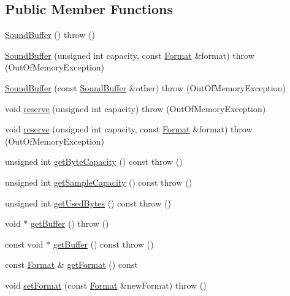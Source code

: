 \subsection*{Public Member Functions}
\begin{DoxyCompactItemize}
\item 
\hyperlink{classAudio_1_1SoundBuffer_a7ee5dea6d25edde63367906605c343a3}{Sound\+Buffer} ()  throw ()
\item 
\hyperlink{classAudio_1_1SoundBuffer_a8147b306d37589176c8dd5a971ea4ab8}{Sound\+Buffer} (unsigned int capacity, const \hyperlink{structAudio_1_1Format}{Format} \&format)  throw (\+Out\+Of\+Memory\+Exception)
\item 
\hyperlink{classAudio_1_1SoundBuffer_ab74bc6e8116beb9629646a24cfd8bd93}{Sound\+Buffer} (const \hyperlink{classAudio_1_1SoundBuffer}{Sound\+Buffer} \&other)  throw (\+Out\+Of\+Memory\+Exception)
\item 
void \hyperlink{classAudio_1_1SoundBuffer_a330ca69d99d6e39d83a419bc7d580b57}{reserve} (unsigned int capacity)  throw (\+Out\+Of\+Memory\+Exception)
\item 
void \hyperlink{classAudio_1_1SoundBuffer_a593491238df1c985a96c805eff2fa752}{reserve} (unsigned int capacity, const \hyperlink{structAudio_1_1Format}{Format} \&format)  throw (\+Out\+Of\+Memory\+Exception)
\item 
unsigned int \hyperlink{classAudio_1_1SoundBuffer_af4d32175623442e285d28a3649c950c8}{get\+Byte\+Capacity} () const   throw ()
\item 
unsigned int \hyperlink{classAudio_1_1SoundBuffer_af505e2ae8e292b03fb373b72388ee290}{get\+Sample\+Capacity} () const   throw ()
\item 
unsigned int \hyperlink{classAudio_1_1SoundBuffer_a88a1a46b15593999f0a288ba691fac54}{get\+Used\+Bytes} () const   throw ()
\item 
void $\ast$ \hyperlink{classAudio_1_1SoundBuffer_acef90321df3cb0dbe97259b3f9cd6d2c}{get\+Buffer} ()  throw ()
\item 
const void $\ast$ \hyperlink{classAudio_1_1SoundBuffer_ad672704d517e3b3b842880049fbbb104}{get\+Buffer} () const   throw ()
\item 
const \hyperlink{structAudio_1_1Format}{Format} \& \hyperlink{classAudio_1_1SoundBuffer_a773e0f5a006541ae134dc6bbc56e1005}{get\+Format} () const 
\item 
void \hyperlink{classAudio_1_1SoundBuffer_a9fdc4ec0d25a341e2f59a1cd26fb5b18}{set\+Format} (const \hyperlink{structAudio_1_1Format}{Format} \&new\+Format)  throw ()

\end{DoxyCompactItemize}
